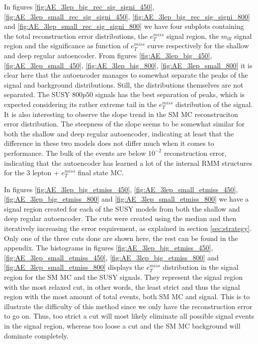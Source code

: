 In figures \ref{fig:AE_3lep_big_rec_sig_signi_450}, \ref{fig:AE_3lep_small_rec_sig_signi_450}, 
\ref{fig:AE_3lep_big_rec_sig_signi_800} and \ref{fig:AE_3lep_small_rec_sig_signi_800} we have four 
subplots containing the total reconstruction error distributions, the $e_T^{miss}$ signal region, 
the $m_{lll}$ signal region and the significance as function of $e_T^{miss}$ curve respectively 
for the shallow and deep regular autoencoder. From figures \ref{fig:AE_3lep_big_450}, 
\ref{fig:AE_3lep_small_450}, \ref{fig:AE_3lep_big_800}, \ref{fig:AE_3lep_small_800} it is clear 
here that the autoencoder manages to somewhat separate the peaks of the signal and background 
distributions. Still, the distributions themselves are not separated. The 
SUSY $800p50$ signals has the best separation of peaks, which is expected considering its 
rather extreme tail in the $e_T^{miss}$ distribution of the signal. It is also interesting to 
observe the slope trend in the SM MC reconstruciton error distribution. The steepness of the 
slope seems to be somewhat similar for both the shallow and deep regular autoencoder, indicating 
at least that the difference in these two models does not differ much when it comes to performance. 
The bulk of the events are below $10^{-2}$ reconstruction error, indicating that the autoencoder 
has learned a lot of the internal RMM structures for the 3 lepton + $e_T^{miss}$ final state MC. \par
In figures \ref{fig:AE_3lep_big_etmiss_450}, \ref{fig:AE_3lep_small_etmiss_450}, 
\ref{fig:AE_3lep_big_etmiss_800} and  \ref{fig:AE_3lep_small_etmiss_800} we have a signal region 
created for each of the SUSY models from both the shallow and deep regular autoencoder. The cuts 
were created using the median and then iteratively increasing the error requirement, as 
explained in section \ref{sec:strategy}. Only one of the three cuts done are shown here, the 
rest can be found in the appendix. The histograms in figures \ref{fig:AE_3lep_big_etmiss_450}, 
\ref{fig:AE_3lep_small_etmiss_450}, \ref{fig:AE_3lep_big_etmiss_800} and  
\ref{fig:AE_3lep_small_etmiss_800} displays the $e_T^{miss}$ distribution in the signal region 
for the SM MC and the SUSY signals. They represent the signal region with the most relaxed cut, 
in other words, the least strict and thus the signal region with the most amount of total events, 
both SM MC and signal. This is to illustrate the difficulty of this method since we only have the 
reconstruction error to go on. Thus, too strict a cut will most likely eliminate all possible 
signal events in the signal region, whereas too loose a cut and the SM MC background will dominate completely.
